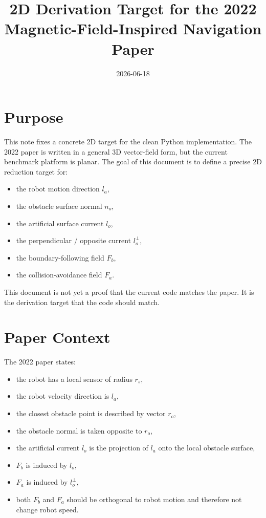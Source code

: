 \documentclass[11pt]{article}
\title{2D Derivation Target for the 2022 Magnetic-Field-Inspired Navigation Paper}
\author{}
\date{2026-06-18}
\begin{document}
\maketitle

\section*{Purpose}

This note fixes a concrete 2D target for the clean Python implementation.
The 2022 paper is written in a general 3D vector-field form, but the current
benchmark platform is planar. The goal of this document is to define a precise
2D reduction target for:

\begin{itemize}[leftmargin=*]
  \item the robot motion direction \(l_a\),
  \item the obstacle surface normal \(n_o\),
  \item the artificial surface current \(l_o\),
  \item the perpendicular / opposite current \(l_o^\perp\),
  \item the boundary-following field \(F_b\),
  \item the collision-avoidance field \(F_a\).
\end{itemize}

This document is not yet a proof that the current code matches the paper.
It is the derivation target that the code should match.

\section*{Paper Context}

The 2022 paper states:

\begin{itemize}[leftmargin=*]
  \item the robot has a local sensor of radius \(r_s\),
  \item the robot velocity direction is \(l_a\),
  \item the closest obstacle point is described by vector \(r_o\),
  \item the obstacle normal is taken opposite to \(r_o\),
  \item the artificial current \(l_o\) is the projection of \(l_a\) onto the local obstacle surface,
  \item \(F_b\) is induced by \(l_o\),
  \item \(F_a\) is induced by \(l_o^\perp\),
  \item both \(F_b\) and \(F_a\) should be orthogonal to robot motion and therefore not change robot speed.
\end{itemize}
\end{document}
